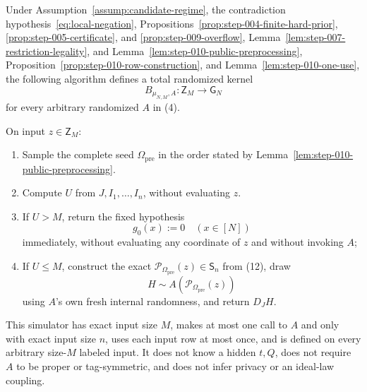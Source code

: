 \begin{proposition}\label{prop:step-010-simulator}
Under Assumption~\ref{assump:candidate-regime}, the contradiction hypothesis~\eqref{eq:local-negation},
Propositions~\ref{prop:step-004-finite-hard-prior},
\ref{prop:step-005-certificate}, and
\ref{prop:step-009-overflow}, Lemma~\ref{lem:step-007-restriction-legality}, and
Lemma~\ref{lem:step-010-public-preprocessing},
Proposition~\ref{prop:step-010-row-construction}, and
Lemma~\ref{lem:step-010-one-use}, the following algorithm defines a
total randomized kernel
\[
  B_{\mu_{N,M},A}:\mathsf Z_M\longrightarrow\mathsf G_N
\]
for every arbitrary randomized \(A\) in (4).

On input \(z\in\mathsf Z_M\):

\begin{enumerate}
\item Sample the complete seed \(\Omega_{\mathrm{pre}}\) in the order stated
by Lemma~\ref{lem:step-010-public-preprocessing}.
\item Compute \(U\) from \(J,I_1,\ldots,I_n\), without evaluating \(z\).
\item If \(U>M\), return the fixed hypothesis
   \[
     g_0(x):=0\quad(x\in[N])
   \tag{16}
   \]
   immediately, without evaluating any coordinate of \(z\) and without
   invoking \(A\);
\item If \(U\le M\), construct the exact
   \(\mathcal P_{\Omega_{\mathrm{pre}}}(z)\in\mathsf S_n\) from (12), draw
   \[
     H\sim A(\mathcal P_{\Omega_{\mathrm{pre}}}(z))
   \]
   using \(A\)'s own fresh internal randomness, and return \(D_JH\).
\end{enumerate}

This simulator has exact input size \(M\), makes at most one call to \(A\)
and only with exact input size \(n\), uses each input row at most once, and
is defined on every arbitrary size-\(M\) labeled input. It does not know a
hidden \(t,Q\), does not require \(A\) to be proper or tag-symmetric, and
does not infer privacy or an ideal-law coupling.
\end{proposition}

